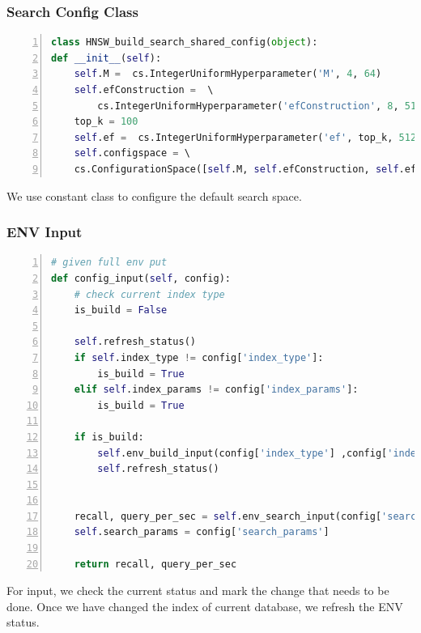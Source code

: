 \documentclass{ol-softwaremanual}
\begin{document}
\subsubsection{Search Config Class}
\begin{lstlisting}[language=python,numbers=left,basicstyle=\footnotesize, caption={Search Config Class}]
class HNSW_build_search_shared_config(object):
def __init__(self):
    self.M =  cs.IntegerUniformHyperparameter('M', 4, 64)
    self.efConstruction =  \ 
        cs.IntegerUniformHyperparameter('efConstruction', 8, 512)
    top_k = 100 
    self.ef =  cs.IntegerUniformHyperparameter('ef', top_k, 512)          
    self.configspace = \ 
    cs.ConfigurationSpace([self.M, self.efConstruction, self.ef], seed=123)
\end{lstlisting}
We use constant class to configure the default search space.


\subsubsection{ENV Input}
\begin{lstlisting}[language=python,numbers=left,basicstyle=\footnotesize, caption={Input}]
# given full env put
def config_input(self, config):
    # check current index type
    is_build = False

    self.refresh_status()
    if self.index_type != config['index_type']:
        is_build = True
    elif self.index_params != config['index_params']:
        is_build = True
    
    if is_build:
        self.env_build_input(config['index_type'] ,config['index_params'])
        self.refresh_status()
    

    recall, query_per_sec = self.env_search_input(config['search_params'])
    self.search_params = config['search_params']
    
    return recall, query_per_sec
\end{lstlisting}
For input, we check the current status and mark the change that needs to be done. Once we have changed the index of current database, we refresh the ENV status.
\end{document}
